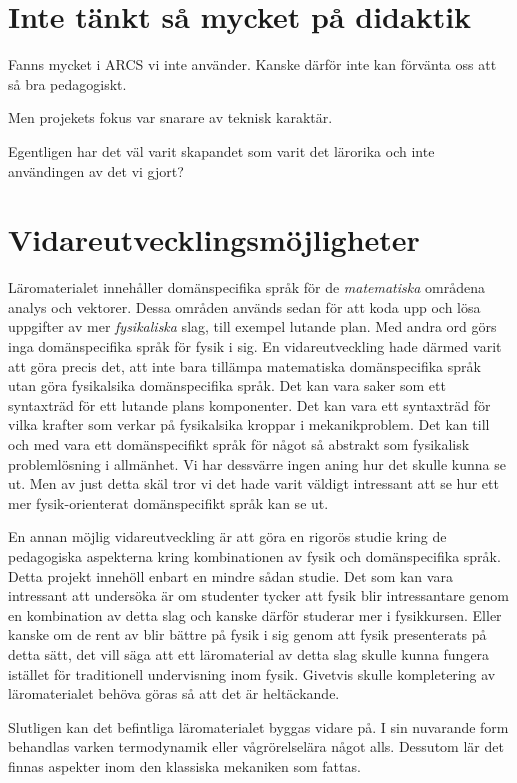 \begin{binge}
\section{Inte tänkt så mycket på didaktik}

Fanns mycket i ARCS vi inte använder. Kanske därför inte kan förvänta oss att så bra pedagogiskt.

Men projekets fokus var snarare av teknisk karaktär.

Egentligen har det väl varit skapandet som varit det lärorika och inte användingen av det vi gjort?

\section{Vidareutvecklingsmöjligheter}

Läromaterialet innehåller domänspecifika språk för de \textit{matematiska} områdena analys och vektorer. Dessa områden används sedan för att koda upp och lösa uppgifter av mer \textit{fysikaliska} slag, till exempel lutande plan. Med andra ord görs inga domänspecifika språk för fysik i sig. En vidareutveckling hade därmed varit att göra precis det, att inte bara tillämpa matematiska domänspecifika språk utan göra fysikalsika domänspecifika språk. Det kan vara saker som ett syntaxträd för ett lutande plans komponenter. Det kan vara ett syntaxträd för vilka krafter som verkar på fysikalsika kroppar i mekanikproblem. Det kan till och med vara ett domänspecifikt språk för något så abstrakt som fysikalisk problemlösning i allmänhet. Vi har dessvärre ingen aning hur det skulle kunna se ut. Men av just detta skäl tror vi det hade varit väldigt intressant att se hur ett mer fysik-orienterat domänspecifikt språk kan se ut.

En annan möjlig vidareutveckling är att göra en rigorös studie kring de pedagogiska aspekterna kring kombinationen av fysik och domänspecifika språk. Detta projekt innehöll enbart en mindre sådan studie. Det som kan vara intressant att undersöka är om studenter tycker att fysik blir intressantare genom en kombination av detta slag och kanske därför studerar mer i fysikkursen. Eller kanske om de rent av blir bättre på fysik i sig genom att fysik presenterats på detta sätt, det vill säga att ett läromaterial av detta slag skulle kunna fungera istället för traditionell undervisning inom fysik. Givetvis skulle kompletering av läromaterialet behöva göras så att det är heltäckande.

Slutligen kan det befintliga läromaterialet byggas vidare på. I sin nuvarande form behandlas varken termodynamik eller vågrörelselära något alls. Dessutom lär det finnas aspekter inom den klassiska mekaniken som fattas.


\end{binge}
